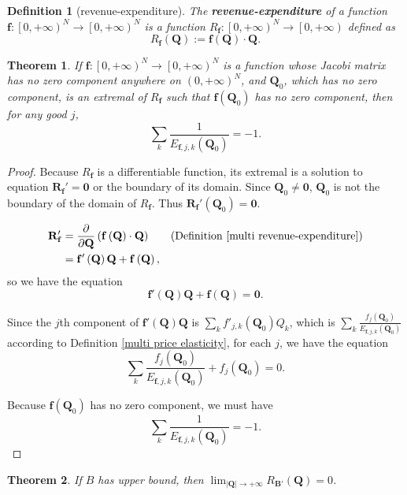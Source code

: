 \documentclass{article}
\newtheorem{theorem}{Theorem}[subsection]
\newtheorem{definition}{Definition}[subsection]
\begin{document}
\begin{definition}[revenue-expenditure]
\label{multi revenue-expenditure}
The \textbf{revenue-expenditure} of a function $\mathbf f:\left[0,+\infty\right)^N\to\left[0,+\infty\right)^N$ is a function $R_\mathbf f:\left[0,+\infty\right)^N\to\left[0,+\infty\right)$ defined as
$$R_\mathbf f\left(\mathbf Q\right):=\mathbf f\left(\mathbf Q\right)\cdot\mathbf Q.$$
\end{definition}

\begin{theorem}
If $\mathbf f:\left[0,+\infty\right)^N\to\left[0,+\infty\right)^N$ is a function whose Jacobi matrix has no zero component anywhere on $\left(0,+\infty\right)^N$, and $\mathbf Q_0$, which has no zero component, is an extremal of $R_\mathbf f$ such that $\mathbf f\left(\mathbf Q_0\right)$ has no zero component, then for any good $j$,
$$\sum_k\frac1{E_{\mathbf f,j,k}\left(\mathbf Q_0\right)}=-1.$$
\end{theorem}
\begin{proof}
Because $R_\mathbf f$ is a differentiable function, its extremal is a solution to equation $\mathbf R_\mathbf f'=\mathbf0$ or the boundary of its domain.
Since $\mathbf Q_0\ne\mathbf0$, $\mathbf Q_0$ is not the boundary of the domain of $R_\mathbf f$.
Thus $\mathbf R_\mathbf f'\left(\mathbf Q_0\right)=\mathbf0$.

\begin{align*}
\mathbf R_\mathbf f'&=\frac\partial{\partial\mathbf Q}\left(\mathbf f\left(\mathbf Q\right)\cdot\mathbf Q\right)&&\text{(Definition \ref{multi revenue-expenditure})}\\
&=\mathbf f'\left(\mathbf Q\right)\mathbf Q+\mathbf f\left(\mathbf Q\right),
\end{align*}
so we have the equation
$$\mathbf f'\left(\mathbf Q\right)\mathbf Q+\mathbf f\left(\mathbf Q\right)=\mathbf0.$$

Since the $j$th component of $\mathbf f'\left(\mathbf Q\right)\mathbf Q$ is $\sum_kf'_{j,k}\left(\mathbf Q_0\right)Q_k$, which is $\sum_k\frac{f_j\left(\mathbf Q_0\right)}{E_{\mathbf f,j,k}\left(\mathbf Q_0\right)}$ according to Definition \ref{multi price elasticity},
for each $j$, we have the equation
$$\sum_k\frac{f_j\left(\mathbf Q_0\right)}{E_{\mathbf f,j,k}\left(\mathbf Q_0\right)}+f_j\left(\mathbf Q_0\right)=0.$$

Because $\mathbf f\left(\mathbf Q_0\right)$ has no zero component,
we must have
$$\sum_k\frac1{E_{\mathbf f,j,k}\left(\mathbf Q_0\right)}=-1.$$
\end{proof}

\begin{theorem}
If $B$ has upper bound, then $\lim_{\left|\mathbf Q\right|\to+\infty}R_{\mathbf B'}\left(\mathbf Q\right)=0$.
\end{theorem}



\end{document}
